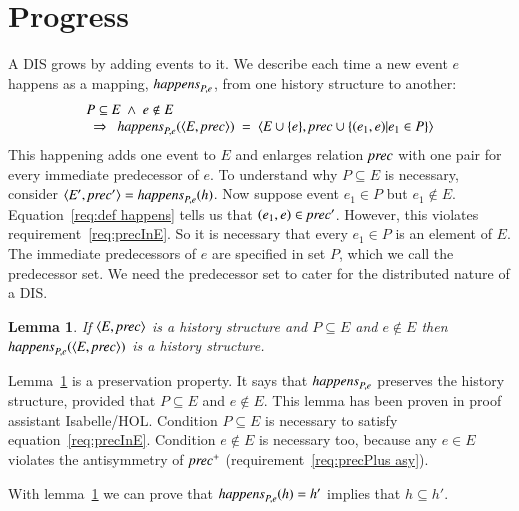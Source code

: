 \documentclass{elsarticle}
\newtheorem{lemma}{Lemma}
\def\id#1{\text{\em #1\/}}
\def\Events{{\mathit E}}
\begin{document}
\section{Progress}
\label{sct:Progress}

	A DIS grows by adding events to it.
	We describe each time a new event $e$ happens as a mapping, $\id{happens}_{P,e}$, from one history structure to another:
\begin{equation}
\begin{array}[b]{l}
	P\subseteq\Events\ \wedge\ e\notin E\\
	\ \ \Rightarrow\ \ \id{happens}_{P,e}(\la \Events, \id{prec}\ra)\ =\ \la \Events\cup\{e\}, \id{prec}\cup\{(e_1,e) | e_1\in P\}\ra
\end{array}
\label{req:def happens}
\end{equation}
	This happening adds one event to $\Events$ and enlarges relation $\id{prec}$ with one pair for every immediate predecessor of $e$.
	To understand why $P\subseteq\Events$ is necessary,
	consider $\la \Events', \id{prec}'\ra=\id{happens}_{P,e}(h)$.
	Now suppose event $e_1\in P$ but $e_1\notin\Events$.
	Equation~\ref{req:def happens} tells us that $(e_1,e)\in\id{prec}'$.
	However, this violates requirement~\ref{req:precInE}.
	So it is necessary that every $e_1\in P$ is an element of $\Events$.
	The immediate predecessors of $e$ are specified in set $P$, which we call the predecessor set.
	We need the predecessor set to cater for the distributed nature of a DIS.
\begin{lemma}
\label{lemma:happens preserves history structure}
	If $\la \Events, \id{prec}\ra$ is a history structure and $P\subseteq\Events$ and $e\notin\Events$
	then $\id{happens}_{P,e}(\la \Events, \id{prec}\ra)$ is a history structure.
\end{lemma}
	Lemma~\ref{lemma:happens preserves history structure} is a preservation property.
	It says that $\id{happens}_{P,e}$ preserves the history structure,
	provided that $P\subseteq\Events$ and $e\notin\Events$.
	This lemma has been proven in proof assistant Isabelle/HOL.
	Condition $P\subseteq\Events$ is necessary to satisfy equation~\ref{req:precInE}.
	Condition $e\notin\Events$ is necessary too,
	because any $e\in\Events$ violates the antisymmetry of $\id{prec}^+$ (requirement~\ref{req:precPlus asy}).

	With lemma~\ref{lemma:happens preserves history structure} we can prove that $\id{happens}_{P,e}(h)=h'$ implies that $h\subseteq h'$.
\end{document}
